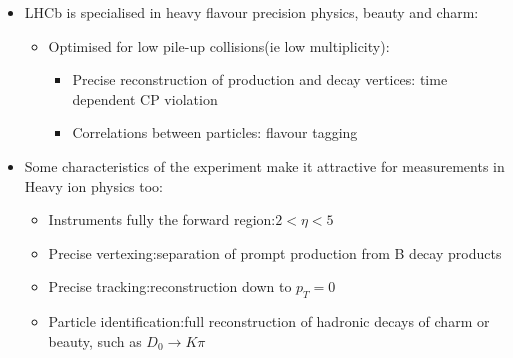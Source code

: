 \documentclass[
10pt, %
a4paper, %
oneside, %
headinclude,footinclude, %
BCOR5mm, %
]{scrartcl}
\begin{document}
\begin{itemize}[noitemsep] %
\item LHCb is specialised in heavy flavour precision physics, beauty and charm:
\begin{itemize}
\item Optimised for low pile-up collisions(ie low multiplicity):
\begin{itemize}
\item Precise reconstruction of production and decay vertices: time dependent CP violation
\item Correlations between particles: flavour tagging
\end{itemize}
\end{itemize}
\item Some characteristics of the experiment make it attractive for measurements in Heavy ion physics too:
\begin{itemize}
\item Instruments fully the forward region:$2<\eta<5$
\item Precise vertexing:separation of prompt production from B decay products
\item Precise tracking:reconstruction down to $p_T=0$
\item Particle identification:full reconstruction of hadronic decays of charm or beauty, such as $D_0 \rightarrow K\pi $
\end{itemize}
\end{itemize}

\end{document}
